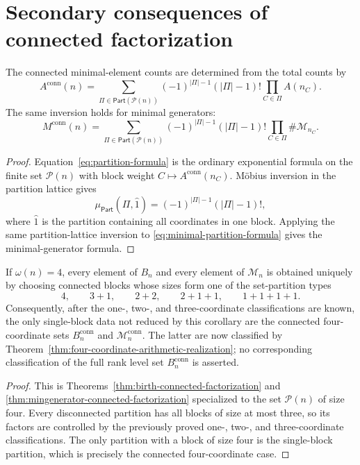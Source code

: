 \section{Secondary consequences of connected factorization}
\label{sec:supp-connected-consequences}

\begin{corollary}\label{cor:connected-inversion}
The connected minimal-element counts are determined from the total counts by
\begin{equation}\label{eq:connected-inversion}
A^{\mathrm{conn}}(n)=
\sum_{\Pi\in\mathsf{Part}(\mathcal P(n))}
(-1)^{|\Pi|-1}(|\Pi|-1)!
\prod_{C\in\Pi}A(n_C).
\end{equation}
The same inversion holds for minimal generators:
\[
M^{\mathrm{conn}}(n)=
\sum_{\Pi\in\mathsf{Part}(\mathcal P(n))}
(-1)^{|\Pi|-1}(|\Pi|-1)!
\prod_{C\in\Pi}\#\mathcal M_{n_C}.
\]
\end{corollary}

\begin{proof}
Equation~\eqref{eq:partition-formula} is the ordinary exponential formula on
the finite set $\mathcal P(n)$ with block weight
$C\mapsto A^{\mathrm{conn}}(n_C)$. M\"obius inversion in the partition lattice
\cite[Section~3.7]{Stanley2012EnumerativeCombinatoricsI}
gives
\[
\mu_{\mathsf{Part}}(\Pi,\hat1)=(-1)^{|\Pi|-1}(|\Pi|-1)!,
\]
where $\hat1$ is the partition containing all coordinates in one block.
Applying the same partition-lattice inversion to
\eqref{eq:minimal-partition-formula} gives the minimal-generator formula.
\end{proof}

\begin{corollary}\label{cor:four-support-reduction}
If $\omega(n)=4$, every element of $B_n$ and every element of
$\mathcal M_n$ is obtained uniquely by choosing connected blocks whose sizes
form one of the set-partition types
\[
4,\qquad 3+1,\qquad 2+2,\qquad 2+1+1,\qquad 1+1+1+1.
\]
Consequently, after the one-, two-, and three-coordinate classifications are
known, the only single-block data not reduced by this corollary are the
connected four-coordinate sets $B_n^{\mathrm{conn}}$ and
$\mathcal M_n^{\mathrm{conn}}$.  The latter are now classified by
Theorem~\ref{thm:four-coordinate-arithmetic-realization}; no corresponding
classification of the full rank level set $B_n^{\mathrm{conn}}$ is asserted.
\end{corollary}

\begin{proof}
This is Theorems~\ref{thm:birth-connected-factorization} and
\ref{thm:mingenerator-connected-factorization} specialized to the set
$\mathcal P(n)$ of size four. Every disconnected partition has all blocks of
size at most three, so its factors are controlled by the previously proved
one-, two-, and three-coordinate classifications. The only partition with a
block of size four is the single-block partition, which is precisely the
connected four-coordinate case.
\end{proof}

